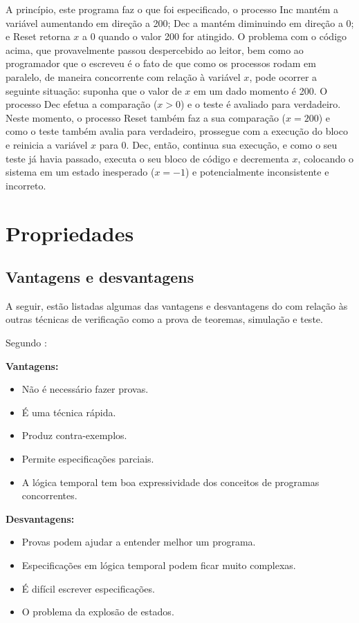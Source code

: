 \documentclass{utfpr-pg}
\begin{document}
A princípio, este programa faz o que foi especificado, o processo \textsf{Inc} mantém a variável aumentando em direção a 200; \textsf{Dec} a mantém diminuindo em direção a 0; e \textsf{Reset} retorna $\mathit{x}$ a 0 quando o valor 200 for atingido. O problema com o código acima, que provavelmente passou despercebido ao leitor, bem como ao programador que o escreveu é o fato de que como os processos rodam em paralelo, de maneira concorrente com relação à variável $\mathit{x}$, pode ocorrer a seguinte situação: suponha que o valor de $\mathit{x}$ em um dado momento é 200. O processo \textsf{Dec} efetua a comparação ($\mathit{x} > 0$) e o teste é avaliado para verdadeiro. Neste momento, o processo \textsf{Reset} também faz a sua comparação ($\mathit{x} = 200$) e como o teste também avalia para verdadeiro, prossegue com a execução do bloco e reinicia a variável $\mathit{x}$ para 0. \textsf{Dec}, então, continua sua execução, e como o seu teste já havia passado, executa o seu bloco de código e decrementa $\mathit{x}$, colocando o sistema em um estado inesperado ($\mathit{x} = -1$) e potencialmente inconsistente e incorreto.

\section{Propriedades}
\lipsum[55]

\subsection{Vantagens e desvantagens}
A seguir, estão listadas algumas das vantagens e desvantagens do com relação às outras técnicas de verificação como a prova de teoremas, simulação e teste.

Segundo :

\noindent
\begin{minipage}[t]{0.49\columnwidth}%
\noindent \textbf{Vantagens:}
\begin{itemize}
\item Não é necessário fazer provas.
\item É uma técnica rápida.
\item Produz contra-exemplos.
\item Permite especificações parciais.
\item A lógica temporal tem boa expressividade dos conceitos de programas concorrentes.
\end{itemize}
\end{minipage}%
\begin{minipage}[t]{0.49\columnwidth}%
\textbf{Desvantagens:}
\begin{itemize}
\item Provas podem ajudar a entender melhor um programa.
\item Especificações em lógica temporal podem ficar muito complexas.
\item É difícil escrever especificações.
\item O problema da explosão de estados.
\end{itemize}
\end{minipage}
\end{document}
